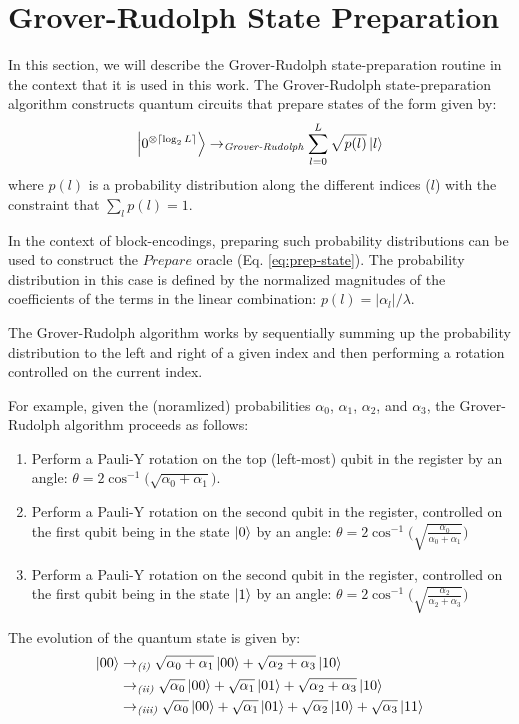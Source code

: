 \section{Grover-Rudolph State Preparation}
\label{sec:grover-rudolph}

In this section, we will describe the Grover-Rudolph state-preparation routine \cite{grover2002creating} in the context that it is used in this work.
The Grover-Rudolph state-preparation algorithm constructs quantum circuits that prepare states of the form given by:
\begin{equation}
    \ket{0^{\otimes \lceil \log_2{L} \rceil}} \rightarrow_{\textit{Grover-Rudolph}} \sum_{l=0}^L \sqrt{p(l)} \ket{l}
\end{equation}
where $p(l)$ is a probability distribution along the different indices ($l$) with the constraint that $\sum_l p(l) = 1$.

In the context of block-encodings, preparing such probability distributions can be used to construct the $Prepare$ oracle (Eq. \ref{eq:prep-state}).
The probability distribution in this case is defined by the normalized magnitudes of the coefficients of the terms in the linear combination: $p(l) = |\alpha_l| / \lambda$.

The Grover-Rudolph algorithm works by sequentially summing up the probability distribution to the left and right of a given index and then performing a rotation controlled on the current index.

For example, given the (noramlized) probabilities $\alpha_0$, $\alpha_1$, $\alpha_2$, and $\alpha_3$, the Grover-Rudolph algorithm proceeds as follows:
\begin{enumerate}
    \item Perform a Pauli-Y rotation on the top (left-most) qubit in the register by an angle: $\theta = 2 \cos^{-1}\big( \sqrt{\alpha_0 + \alpha_1} \big)$.
    \item Perform a Pauli-Y rotation on the second qubit in the register, controlled on the first qubit being in the state $\ket{0}$ by an angle: $\theta = 2 \cos^{-1}\big( \sqrt{\frac{\alpha_0}{\alpha_0 + \alpha_1}} \big)$
    \item Perform a Pauli-Y rotation on the second qubit in the register, controlled on the first qubit being in the state $\ket{1}$ by an angle: $\theta = 2 \cos^{-1}\big( \sqrt{\frac{\alpha_2}{\alpha_2 + \alpha_3}} \big)$
\end{enumerate}

The evolution of the quantum state is given by:
\begin{equation}
    \begin{split}
        \ket{00} &\rightarrow_{\textit{(i)}} \sqrt{\alpha_0 + \alpha_1} \ket{00} + \sqrt{\alpha_2 + \alpha_3} \ket{10} \\
        &\rightarrow_{\textit{(ii)}} \sqrt{\alpha_0} \ket{00} + \sqrt{\alpha_1} \ket{01} + \sqrt{\alpha_2 + \alpha_3} \ket{10} \\
        &\rightarrow_{\textit{(iii)}} \sqrt{\alpha_0} \ket{00} + \sqrt{\alpha_1} \ket{01} + \sqrt{\alpha_2} \ket{10} + \sqrt{\alpha_3} \ket{11}
    \end{split}
\end{equation}

